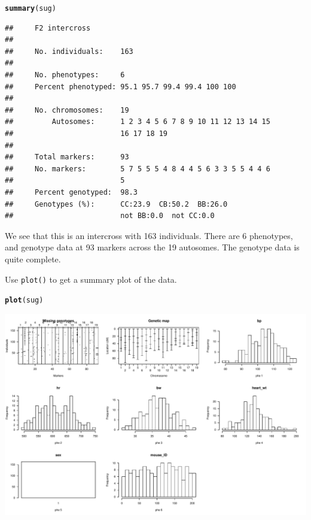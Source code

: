 \documentclass[12pt]{article}\usepackage[]{graphicx}\usepackage[]{color}
\makeatletter
\def\maxwidth{ %
  \ifdim\Gin@nat@width>\linewidth
    \linewidth
  \else
    \Gin@nat@width
  \fi
}
\newcommand{\hlstd}[1]{\textcolor[rgb]{0.345,0.345,0.345}{#1}}%
\newcommand{\hlkwd}[1]{\textcolor[rgb]{0.737,0.353,0.396}{\textbf{#1}}}%
\newenvironment{kframe}{%
 \def\at@end@of@kframe{}%
 \ifinner\ifhmode%
  \def\at@end@of@kframe{\end{minipage}}%
  \begin{minipage}{\columnwidth}%
 \fi\fi%
 \def\FrameCommand##1{\hskip\@totalleftmargin \hskip-\fboxsep
 \colorbox{shadecolor}{##1}\hskip-\fboxsep
     \hskip-\linewidth \hskip-\@totalleftmargin \hskip\columnwidth}%
 \MakeFramed {\advance\hsize-\width
   \@totalleftmargin\z@ \linewidth\hsize
   \@setminipage}}%
 {\par\unskip\endMakeFramed%
 \at@end@of@kframe}
\newenvironment{knitrout}{}{} %
\makeatother
\begin{document}
\begin{knitrout}
\color{fgcolor}\begin{kframe}
\begin{alltt}
\hlkwd{summary}\hlstd{(sug)}
\end{alltt}
\begin{verbatim}
##     F2 intercross
## 
##     No. individuals:    163 
## 
##     No. phenotypes:     6 
##     Percent phenotyped: 95.1 95.7 99.4 99.4 100 100 
## 
##     No. chromosomes:    19 
##         Autosomes:      1 2 3 4 5 6 7 8 9 10 11 12 13 14 15 
##                         16 17 18 19 
## 
##     Total markers:      93 
##     No. markers:        5 7 5 5 5 4 8 4 4 5 6 3 3 5 5 4 4 6 
##                         5 
##     Percent genotyped:  98.3 
##     Genotypes (%):      CC:23.9  CB:50.2  BB:26.0 
##                         not BB:0.0  not CC:0.0
\end{verbatim}
\end{kframe}
\end{knitrout}

We see that this is an intercross with 163 individuals.
There are 6 phenotypes, and genotype data at
93 markers across the 19 autosomes.  The genotype
data is quite complete.

Use {\tt plot()} to get a summary plot of the data.

\begin{knitrout}
\color{fgcolor}\begin{kframe}
\begin{alltt}
\hlkwd{plot}\hlstd{(sug)}
\end{alltt}
\end{kframe}
\includegraphics[width=\maxwidth]{RnwFigs/summary_plot-1} 

\end{knitrout}
\end{document}
